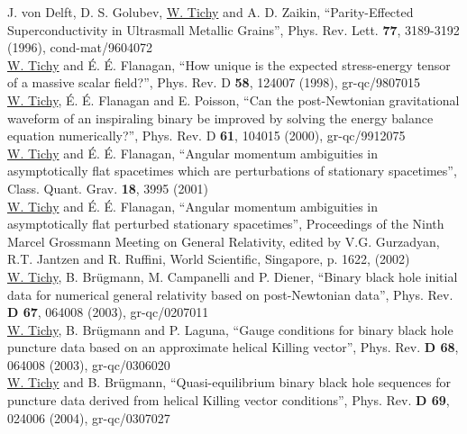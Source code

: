 
%
%

J. von Delft, D. S. Golubev, \underline{W. Tichy} and A. D. Zaikin,
``Parity-Effected Superconductivity in Ultrasmall Metallic Grains'',
Phys. Rev. Lett. {\bf 77}, 3189-3192 (1996), cond-mat/9604072 
\\

\underline{W. Tichy} and \'E. \'E. Flanagan, 
``How unique is the expected stress-energy tensor of a massive scalar
field?'',
Phys. Rev. D {\bf 58}, 124007 (1998), gr-qc/9807015 
\\

\underline{W. Tichy}, \'E. \'E. Flanagan and E. Poisson,
``Can the post-Newtonian gravitational waveform of an inspiraling binary
be improved by solving the energy balance equation numerically?'',
Phys. Rev. D {\bf 61}, 104015 (2000), gr-qc/9912075 
\\

\underline{W. Tichy} and \'E. \'E. Flanagan,
``Angular momentum ambiguities in asymptotically flat spacetimes which 
are perturbations of stationary spacetimes'', 
Class. Quant. Grav. {\bf 18}, 3995 (2001)
\\

\underline{W. Tichy} and \'E. \'E. Flanagan,
``Angular momentum ambiguities in asymptotically flat perturbed
stationary spacetimes'',
Proceedings of the Ninth Marcel Grossmann Meeting on
General Relativity, edited by V.G. Gurzadyan, R.T. Jantzen and R. Ruffini,
World Scientific, Singapore, p. 1622, (2002)
\\

\underline{W. Tichy}, B. Br\"ugmann, M. Campanelli and P. Diener, 
``Binary black hole initial data for numerical general
relativity based on post-Newtonian data'', 
Phys. Rev. {\bf D 67}, 064008 (2003), gr-qc/0207011
\\

\underline{W. Tichy}, B. Br\"ugmann and P. Laguna, 
``Gauge conditions for binary black hole puncture data 
based on an approximate helical Killing vector'', 
Phys. Rev. {\bf D 68}, 064008 (2003), gr-qc/0306020
\\

\underline{W. Tichy} and B. Br\"ugmann,
``Quasi-equilibrium binary black hole sequences for 
puncture data derived from helical Killing vector conditions'', 
Phys. Rev. {\bf D 69}, 024006 (2004), gr-qc/0307027
\\

